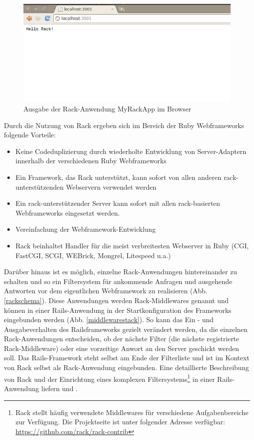 \begin{figure}[!h]
\begin{center}
\includegraphics[scale=0.6]{images/rack/outputrack.png}
\caption{Ausgabe der Rack-Anwendung MyRackApp im Browser}
\label{rackoutput}
\end{center}
\end{figure}

Durch die Nutzung von Rack ergeben sich im Bereich der Ruby Webframeworks folgende Vorteile:

\begin{itemize}
\item
Keine Codeduplizierung durch wiederholte Entwicklung von Server-Adaptern innerhalb der verschiedenen Ruby Webframeworks
\item
Ein Framework, das Rack unterstützt, kann sofort von allen anderen rack-unterstützenden Webservern verwendet werden
\item
Ein rack-unterstützender Server kann sofort mit allen rack-basierten Webframeworks eingesetzt werden.
\item
Vereinfachung der Webframework-Entwicklung
\item
Rack beinhaltet Handler für die meist verbreitesten Webserver in Ruby (CGI, FastCGI, SCGI, WEBrick, Mongrel, Litespeed u.a.)
\end{itemize}


Darüber hinaus ist es  möglich, einzelne Rack-Anwendungen hintereinander zu schalten und so ein Filtersystem für ankommende Anfragen und ausgehende Antworten vor dem eigentlichen Webframework zu realisieren (Abb. \ref{rackschema}).
Diese Anwendungen werden Rack-Middlewares genannt und können in einer Rails-Anwendung in der Startkonfiguration des Frameworks eingebunden werden (Abb. \ref{middlewarestack}). So kann das Ein - und Ausgabeverhalten des Railsframeworks gezielt verändert werden, da die einzelnen Rack-Anwendungen entscheiden, ob der nächste Filter (die nächste registrierte Rack-Middleware) oder eine vorzeitige Anwort an den Server geschickt werden soll.
Das Rails-Framework steht selbst am Ende der Filterliste und ist im Kontext von Rack selbst als Rack-Anwendung eingebunden.
Eine detaillierte Beschreibung von Rack und der Einrichtung eines komplexen Filtersystems\footnote{Rack stellt häufig verwendete Middlewares für verschiedene Aufgabenbereiche zur Verfügung. Die Projektseite ist unter folgender Adresse verfügbar: \href{https://github.com/rack/rack-contrib}{https://github.com/rack/rack-contrib}} in einer Rails-Anwendung liefern \cite{rack} und \cite{railsguiderack}.

